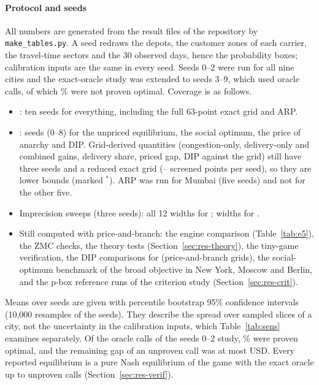 \documentclass[preprint,12pt]{elsarticle}
\theoremstyle{definition}
\theoremstyle{remark}
\begin{document}
\paragraph{Protocol and seeds} All numbers are generated from the result files of the repository by \texttt{make\_tables.py}. A seed redraws the depots, the customer zones of each carrier, the travel-time sectors and the 30 observed days, hence the probability boxes; calibration inputs are the same in every seed. Seeds 0--2 were run for all nine cities and the exact-oracle study was extended to seeds 3--9, which used \TenOracleCalls{} oracle calls, of which \TenUnprovenPct\% were not proven optimal. Coverage is as follows.
\begin{itemize}[leftmargin=*,itemsep=0pt]
\item \TenFullCities{}: ten seeds for everything, including the full 63-point exact grid and ARP.
\item \TenRedCities: \TenRedSeedsMax{} seeds (0--8) for the unpriced equilibrium, the social optimum, the price of anarchy and DIP. Grid-derived quantities (congestion-only, delivery-only and combined gains, delivery share, priced gap, DIP against the grid) still have three seeds and a reduced exact grid (\ExEtwoRedMin--\ExEtwoRedMax{} screened points per seed), so they are lower bounds (marked $^*$). ARP was run for Mumbai (five seeds) and not for the other five.
\item Imprecision sweeps (three seeds): all 12 widths for \ExEfourFullCities; \ExEfourRedWidths{} widths for \ExEfourRedCities.
\item Still computed with price-and-branch: the engine comparison (Table~\ref{tab:e5}), the ZMC checks, the theory tests (Section~\ref{sec:res-theory}), the tiny-game verification, the DIP comparisons for \DipPbCases{} (price-and-branch grids), the social-optimum benchmark of the broad objective in New York, Moscow and Berlin, and the p-box reference runs of the criterion study (Section~\ref{sec:res-crit}).
\end{itemize}
Means over seeds are given with percentile bootstrap 95\% confidence intervals (10{,}000 resamples of the seeds). They describe the spread over sampled slices of a city, not the uncertainty in the calibration inputs, which Table~\ref{tab:sens} examines separately. Of the \ExCalls{} oracle calls of the seeds 0--2 study, \ExProvenPct\% were proven optimal, and the remaining gap of an unproven call was at most \ExMaxGap{} USD. Every reported equilibrium is a pure Nash equilibrium of the game with the exact oracle up to unproven calls (Section~\ref{sec:res-verif}).
\end{document}
